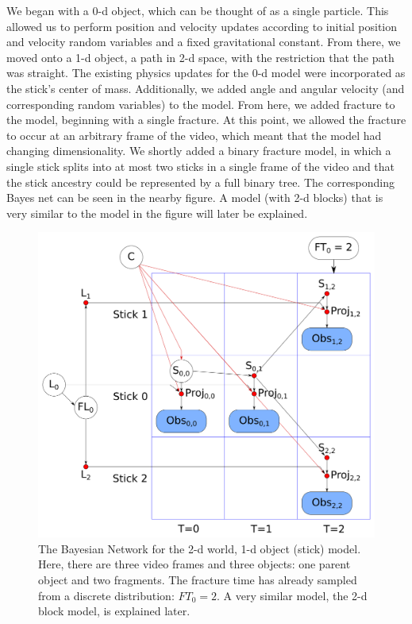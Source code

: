 \documentclass[10pt,twocolumn,letterpaper]{article}
\begin{document}
We began with a 0-d object, which can be thought of as a single particle. This 
allowed us to perform position and velocity updates according to initial 
position and velocity random variables and a fixed gravitational constant. 
From there, we moved onto a 1-d 
object, a path in 2-d space, with the restriction that the path was straight. 
The existing physics updates for the 0-d model were 
incorporated as the stick's center of mass. Additionally, we added angle 
and angular velocity (and corresponding random variables) to the model. From 
here, we added fracture to the model, 
beginning with a single fracture. At this point, we allowed the fracture to occur at 
an arbitrary frame of the video, which meant that the model had changing 
dimensionality. We shortly added a binary fracture model, in which a single 
stick splits into at most two sticks in a single frame of the video and that the 
stick ancestry could be represented by a full binary tree. The 
corresponding Bayes net can be seen in the nearby figure. A model (with 2-d blocks) 
that is very similar to the model in the figure will later be explained.

\begin{figure}[t]
\begin{center}
   \includegraphics[width=0.8\linewidth]{figs/2d-stick-net-20190930.png}
\end{center}
   \caption{The Bayesian Network for the 2-d world, 1-d object (stick) model. Here, 
        there are three video frames and three objects: one parent object and 
        two fragments. The fracture time has already sampled from 
        a discrete distribution: $FT_0 = 2$. A very similar model, the 
        2-d block model, is explained later.}
\label{fig:long}
\label{fig:onecol}
\end{figure}
\end{document}
